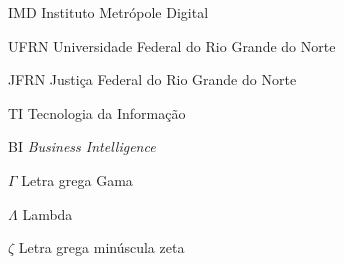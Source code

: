 \documentclass[
    12pt,				%
	oneside,            %
	a4paper,			%
	english,			%
	french,
	spanish,
	brazil				%
	]{abntex2}
\begin{document}
\begin{siglas}
  \item[IMD] Instituto Metrópole Digital
  \item[UFRN] Universidade Federal do Rio Grande do Norte
  \item[JFRN] Justiça Federal do Rio Grande do Norte
  \item[TI] Tecnologia da Informação
  \item[BI] \textit{Business Intelligence}
  
\end{siglas}

\begin{simbolos}
  \item[$\Gamma$] Letra grega Gama
  \item[$\Lambda$] Lambda
  \item[$\zeta$] Letra grega minúscula zeta
\end{simbolos}

\tableofcontents*
\clearpage


\textual



\postextual



\begin{anexosenv}
	
\end{anexosenv}
\end{document}
